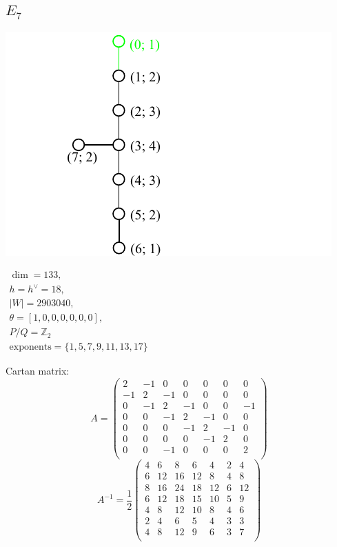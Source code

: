 \documentclass[12pt]{article}
\newcommand{\Zb}{\mathbb{Z}}
\newcommand{\hc}{h^{\vee}}
\begin{document}
\subsection*{$E_7$}
\parbox{8cm}{\includegraphics{lie_E7.pdf}}
$
\begin{array}{l}
 \dim = 133, \\
  h=\hc= 18,\\
 |W|= 2903040,\\
 \theta=[1,0,0,0,0,0,0],\\
 P/Q=\Zb_2 \\
 \text{exponents}={\{1,5,7,9,11,13,17\}}
\end{array}
$

Cartan matrix:
\[
A=\left(
\begin{array}{ccccccc}
 2 &-1& 0& 0& 0 & 0 &0   \\
 -1& 2&-1& 0& 0 & 0 & 0 \\
 0 &-1& 2&-1& 0 & 0 & -1 \\
 0 &0 &-1& 2&-1 & 0 & 0\\
 0 &0 &0 &-1& 2 &-1 & 0 \\
 0 &0 & 0 & 0&-1& 2 & 0\\
 0 &0 &-1 & 0& 0& 0 & 2\\
\end{array}
\right)\]
\[
A^{-1}=
\frac{1}{2}\left(
\begin{array}{ccccccc}
  4& 6& 8& 6& 4& 2& 4 \\
  6&12&16&12& 8& 4& 8 \\
  8&16&24&18&12& 6& 12 \\
  6&12&18&15&10& 5& 9 \\
  4& 8&12&10& 8& 4& 6 \\
  2& 4& 6& 5& 4& 3& 3 \\
  4& 8&12& 9& 6& 3& 7 \\
\end{array}
\right)
\]
\end{document}
